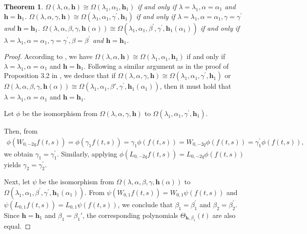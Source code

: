 \documentclass[a4paper]{amsart}
\numberwithin{equation}{section}
\newtheorem{theorem}{Theorem}[section]
\begin{document}
 \begin{theorem}
    \label{prop3.2}
     $\Omega(\lambda,\alpha,\mathbf{h})\cong \Omega(\lambda_{1},\alpha_{1},\mathbf{h}_{1})$ if and only if $\lambda=\lambda_{1},\alpha=\alpha_{1}$ and $\mathbf{h}=\mathbf{h}_{1}$. $\Omega(\lambda,\alpha,\gamma,\mathbf{h})\cong \Omega(\lambda_{1},\alpha_{1},\gamma^{'},\mathbf{h}_{1})$ if and only if $\lambda=\lambda_{1},\alpha=\alpha_{1},\gamma=\gamma^{'}$ and $\mathbf{h}=\mathbf{h}_{1}$. $\Omega(\lambda,\alpha,\beta,\gamma,\mathbf h(\alpha))\cong \Omega(\lambda_{1},\alpha_1,\beta^{'},\gamma^{'},\mathbf h_{1}(\alpha_1))$ if and only if $\lambda=\lambda_{1},\alpha=\alpha_{1},\gamma=\gamma^{'},\beta=\beta^{'}$ and $\mathbf{h}=\mathbf{h}_{1}$. 
 \end{theorem}
\begin{proof}
    According to \cite{CG17}, we have $\Omega(\lambda,\alpha,\mathbf{h})\cong \Omega(\lambda_{1},\alpha_{1},\mathbf{h}_{1})$ if and only if $\lambda=\lambda_{1},\alpha=\alpha_{1}$ and $\mathbf{h}=\mathbf{h}_{1}$. Following a similar argument as in the proof of Proposition 3.2 in \cite{CG17}, we deduce that if $\Omega(\lambda,\alpha,\gamma,\mathbf{h})\cong \Omega(\lambda_{1},\alpha_{1},\gamma^{'},\mathbf{h}_{1})$ or
$\Omega(\lambda,\alpha,\beta,\gamma,\mathbf h(\alpha))\cong \Omega(\lambda_{1},\alpha_1,\beta{'},\gamma^{'},\mathbf h_{1}(\alpha_1))$, then it must hold that $\lambda=\lambda_{1},\alpha=\alpha_{1}$ and 
    $\mathbf{h}=\mathbf{h}_{1}$.

    Let $\phi$ be the isomorphism from $\Omega(\lambda,\alpha,\gamma,\mathbf{h})$ to $ \Omega(\lambda_{1},\alpha_{1},\gamma^{'},\mathbf{h}_{1})$. 
    
    Then, from
    \begin{align*}
    \phi(W_{0,-2q}f(t,s))=\phi(\gamma_{1}f(t,s))=\gamma_{1}\phi(f(t,s))=W_{0,-2q}\phi(f(t,s))=\gamma_{1}^{'}\phi(f(t,s)),
    \end{align*}
    we obtain $\gamma_{1}=\gamma_{1}^{'}$. Similarly, applying $\phi(L_{0,-2q}f(t,s))=L_{0,-2q}\phi(f(t,s))$ yields $\gamma_{2}=\gamma_{2}^{'}$.

    Next, let $\psi$ be the isomorphism from $\Omega(\lambda,\alpha,\beta,\gamma,\mathbf h(\alpha))$ to $\Omega(\lambda_{1},\alpha_1,\beta^{'},\gamma^{'},\mathbf h_{1}(\alpha_1))$. From $\psi(W_{0,1}f(t,s))=W_{0,1}\psi(f(t,s))$ and $\psi(L_{0,1}f(t,s))=L_{0,1}\psi(f(t,s))$, we conclude that $\beta_{1}=\beta_{1}^{'}$ and $\beta_{2}=\beta_{2}^{'}$. Since $\mathbf h=\mathbf h_1$ and $\beta_1=\beta_1'$, the corresponding polynomials $\Theta_{\mathbf h,\beta_1}(t)$ are also equal. 
\end{proof}
\end{document}
